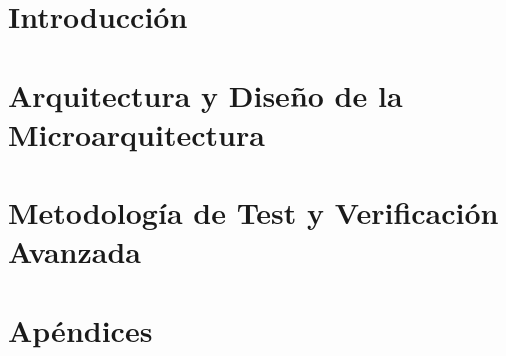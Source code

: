 \documentclass[12pt,a4paper]{book} %
\begin{document}
\frontmatter

%









%







\mainmatter

%

\part{Introducción}



\part{Arquitectura y Diseño de la Microarquitectura}





\part{Metodología de Test y Verificación Avanzada}






%

\part{Apéndices}

\appendix



%

%

\backmatter




\end{document}
